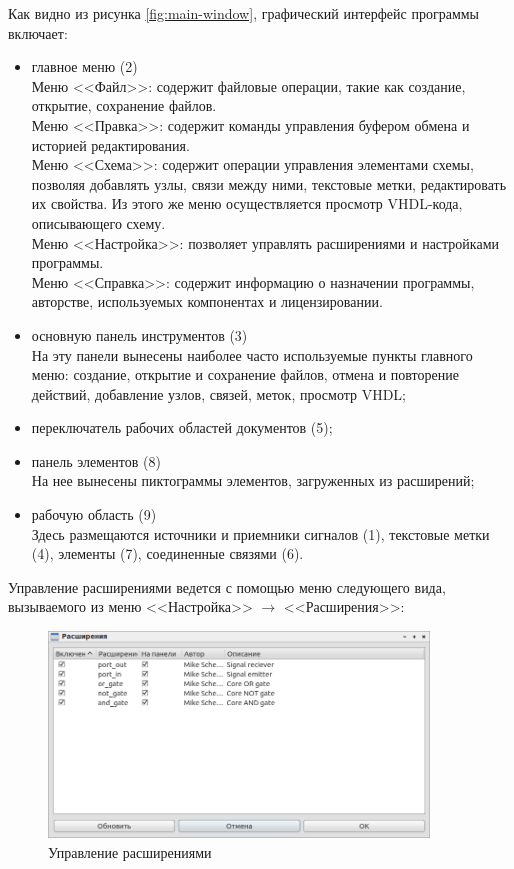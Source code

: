 Как видно из рисунка \ref{fig:main-window}, графический интерфейс программы включает:
\begin{itemize}
  \item главное меню (2)\\
  Меню <<Файл>>: содержит файловые операции, такие как создание, открытие, сохранение файлов.\\
  Меню <<Правка>>: содержит команды управления буфером обмена и историей редактирования.\\
  Меню <<Схема>>: содержит операции управления элементами схемы, позволяя добавлять узлы, связи между ними, текстовые метки, редактировать их свойства.
  Из этого же меню осуществляется просмотр VHDL-кода, описывающего схему.\\
  Меню <<Настройка>>: позволяет управлять расширениями и настройками программы.\\
  Меню <<Справка>>: содержит информацию о назначении программы, авторстве, используемых компонентах и лицензировании.
  \item основную панель инструментов (3)\\
  На эту панели вынесены наиболее часто используемые пункты главного меню: создание, открытие и сохранение файлов, отмена и повторение действий, добавление узлов, связей, меток, просмотр VHDL;
  \item переключатель рабочих областей документов (5);
  \item панель элементов (8)\\
  На нее вынесены пиктограммы элементов, загруженных из расширений;
  \item рабочую область (9)\\
  Здесь размещаются источники и приемники сигналов (1), текстовые метки (4), элементы (7), соединенные связями (6).
\end{itemize}

Управление расширениями ведется с помощью меню следующего вида, вызываемого из меню <<Настройка>> $\rightarrow$ <<Расширения>>:
\begin{figure}[H]
  \centering
  \includegraphics[width=0.9\textwidth]{gui/plugins.png}
  \caption{Управление расширениями}
  \label{fig:plugins}
\end{figure}

